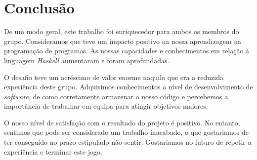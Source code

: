 \chapter{Conclusão}

De um modo geral, este trabalho foi enriquecedor para ambos os membros do grupo.
Consideramos que teve um impacto positivo na nossa aprendizagem na programação
de programas. As nossas capacidades e conhecimentos em relação à linguagem
\emph{Haskell} aumentaram e foram aprofundadas.

O desafio teve um acréscimo de valor enorme naquilo que era a reduzida
experiência deste grupo. Adquirimos conhecimentos a nível de desenvolvimento
de \emph{software}, de como corretamente armazenar o nosso código e percebemos a
importância de trabalhar em equipa para atingir objetivos maiores.

O nosso nível de satisfação com o resultado do projeto é positivo. No entanto,
sentimos que pode ser considerado um trabalho inacabado, o que gostariamos de
ter conseguido no prazo estipulado não sentir. Gostariamos no futuro de repetir
a experiência e terminar este jogo.
